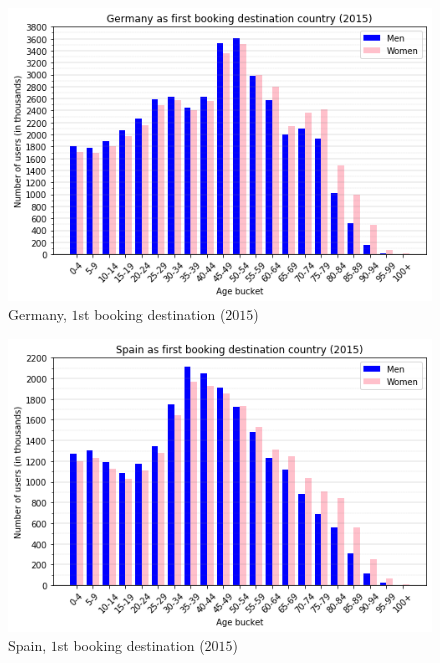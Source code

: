 \documentclass[twocolumn, switch]{article}
\begin{document}
\begin{figure}[H]
\centering
\includegraphics[scale=0.35]{../graphs/age_gender_bkts_DE}
\caption{Germany, $1$st booking destination ($2015$)}
\label{fig:germany}
\end{figure}

\begin{figure}[H]
\centering
\includegraphics[scale=0.35]{../graphs/age_gender_bkts_ES}
\caption{Spain, $1$st booking destination ($2015$)}
\label{fig:spain}
\end{figure}
\end{document}
